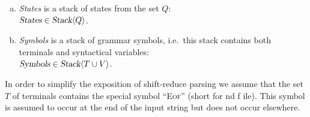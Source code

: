 \begin{enumerate}[(a)]
\item \textsl{States} is a stack of states from the set $Q$:
      \\[0.2cm]
      \hspace*{1.3cm}
      $\textsl{States} \in \textsl{Stack}\langle Q \rangle$.
\item \textsl{Symbols} is a stack of grammar symbols, i.e.~this stack contains both terminals and syntactical
      variables:
      \\[0.2cm]
      \hspace*{1.3cm}
      $\textsl{Symbols} \in \textsl{Stack}\langle T \cup V \rangle$.
\end{enumerate}
In order to simplify the exposition of shift-reduce parsing we assume that the set $T$ of terminals contains
the special symbol ``\textsc{Eof}'' (short for nd f ile).
This symbol is assumed to occur at the end of the input string but does not occur elsewhere.


